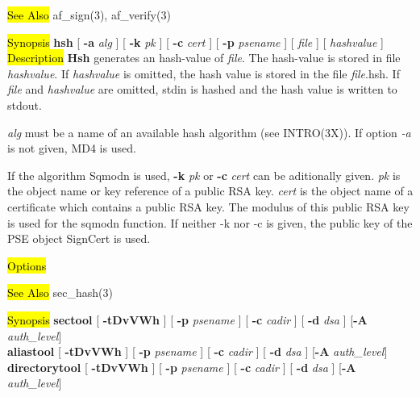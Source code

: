 


\hl{See Also}
af\_sign(3), af\_verify(3)

\label{hsh}
\hl{Synopsis}
{\bf hsh} [ {\bf -a} {\em alg} ] [ {\bf -k} {\em pk} ] [ {\bf -c} {\em cert} ] [ {\bf -p} {\em psename} ] [ {\em file} ] [ 
{\em hashvalue} ] \\
\hl{Description}
{\bf Hsh} generates an hash-value of {\em file}. The hash-value is stored in file {\em hashvalue}.
If {\em hashvalue} is omitted, 
the hash value is stored in the file {\em file}.hsh. If {\em file} and {\em hashvalue} are omitted, stdin is 
hashed and 
the hash value is written to stdout.

{\em alg} must be a name of an available hash algorithm (see INTRO(3X)). If option
{\em -a} is not given, MD4 is used.

If the algorithm Sqmodn is used, {\bf -k} {\em pk} or {\bf -c} {\em cert}
can be aditionally given. {\em pk} is the object name or key reference of a public RSA key.
{\em cert} is the object name of a certificate which contains a public RSA
key. The modulus of this public RSA key is used for the sqmodn function. If neither -k nor -c
is given, the public key of the PSE object SignCert is used. 

\hl{Options}


  
 
\hl{See Also}
sec\_hash(3)

\label{sectool}
\hl{Synopsis}
{\bf sectool} [ {\bf -tDvVWh} ] [ {\bf -p} {\em psename} ] [ {\bf -c} {\em cadir} ] [ {\bf -d} {\em dsa} ] [{\bf -A} {\em auth\_level}] \\
{\bf aliastool} [ {\bf -tDvVWh} ] [ {\bf -p} {\em psename} ] [ {\bf -c} {\em cadir} ] [ {\bf -d} {\em dsa} ] [{\bf -A} {\em auth\_level}] \\
{\bf directorytool} [ {\bf -tDvVWh} ] [ {\bf -p} {\em psename} ] [ {\bf -c} {\em cadir} ] [ {\bf -d} {\em dsa} ] [{\bf -A} {\em auth\_level}]

